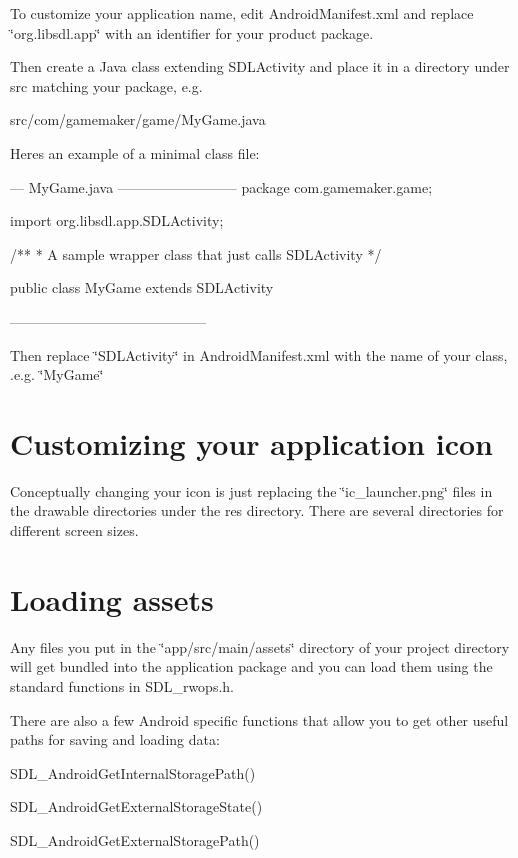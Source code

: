 To customize your application name, edit Android\+Manifest.\+xml and replace \char`\"{}org.\+libsdl.\+app\char`\"{} with an identifier for your product package.

Then create a Java class extending S\+D\+L\+Activity and place it in a directory under src matching your package, e.\+g. \begin{DoxyVerb}src/com/gamemaker/game/MyGame.java
\end{DoxyVerb}


Here\textquotesingle{}s an example of a minimal class file\+: \begin{DoxyVerb}--- MyGame.java --------------------------
package com.gamemaker.game;

import org.libsdl.app.SDLActivity; 

/**
 * A sample wrapper class that just calls SDLActivity 
 */ 

public class MyGame extends SDLActivity { }

------------------------------------------
\end{DoxyVerb}


Then replace \char`\"{}\+S\+D\+L\+Activity\char`\"{} in Android\+Manifest.\+xml with the name of your class, .e.\+g. \char`\"{}\+My\+Game\char`\"{}



 \section*{Customizing your application icon }

Conceptually changing your icon is just replacing the \char`\"{}ic\+\_\+launcher.\+png\char`\"{} files in the drawable directories under the res directory. There are several directories for different screen sizes.



 \section*{Loading assets }

Any files you put in the \char`\"{}app/src/main/assets\char`\"{} directory of your project directory will get bundled into the application package and you can load them using the standard functions in S\+D\+L\+\_\+rwops.\+h.

There are also a few Android specific functions that allow you to get other useful paths for saving and loading data\+:
\begin{DoxyItemize}
\item S\+D\+L\+\_\+\+Android\+Get\+Internal\+Storage\+Path()
\item S\+D\+L\+\_\+\+Android\+Get\+External\+Storage\+State()
\item S\+D\+L\+\_\+\+Android\+Get\+External\+Storage\+Path()
\end{DoxyItemize}

